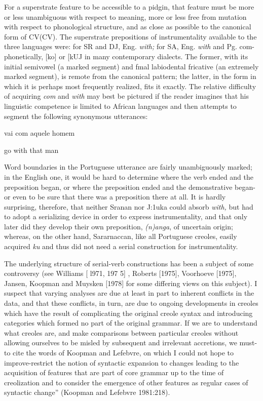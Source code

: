 For a superstrate feature to be accessible to a pidgin, that feature must be more or less unambiguous with respect to meaning, more or less free from mutation with respect to phonological structure, and as close as possible to the canonical form of CV(CV). The superstrate prepositions of instrumentality available to the three languages were: for SR and DJ, Eng. \textit{with;} for SA, Eng. \textit{with} and Pg. com-phonetically, [ko] or [kUJ in many contemporary dialects. The former, with its initial semivowel (a marked segment) and fmal labiodental fricative (an extremely marked segment), is remote from the canonical pattern; the latter, in the form in which it is perhaps most frequently realized, fits it exactly. The relative difficulty of acquiring \textit{com} and \textit{with} may best be pictured if the reader imagines that his linguistic competence
is limited to African languages and then attempts to segment the following synonymous utterances:

\ea\label{ex:234}
 vai com aquele homem
\z

\ea\label{ex:235}
 go with that man
\z

Word boundaries in the Portuguese utterance are fairly un\-ambiguously marked; in the English one, it would be hard to determine where the verb ended and the preposition began, or where the preposi\-tion ended and the demonstrative began-or even to be sure that there was a preposition there at all. It is hardly surprising, therefore, that neither Sranan nor J:1uka could absorb \textit{with,} but had to adopt a serializ\-ing device in order to express instrumentality, and that only later did they develop their own preposition, \textit{(n)anga}, of uncertain origin;
whereas, on the other hand, Sararnaccan, like all Portuguese creoles, easily acquired \textit{ku} and thus did not need a serial construction for instrumentality.

The underlying structure of serial-verb constructions has been a subject of some controversy (see Williams [ l971, 197 5] , Roberts [1975], Voorhoeve [1975], Jansen, Koopman and Muysken [1978] for some differing views on this subject). I suspect that varying analyses are due at least in part to inherent conflicts in the data, and that these conflicts, in turn, are due to ongoing developments in creoles which have the result of complicating the original creole syntax and intro\-ducing categories which formed no part of the original grammar. If we are to understand what creoles are, and make comparisons between particular creoles without allowing ourselves to be misled by sub\-sequent and irrelevant accretions, we must-to cite the words of Koop\-man and Lefebvre, on which I could not hope to improve{}-{\textquotedbl}restrict the notion of syntactic expansion to changes leading to the acquisition of features that are part of core grammar up to the time of creolization and to consider the emergence of other features as regular cases of syntactic change'' (Koopman and Lefebvre 1981:218).

